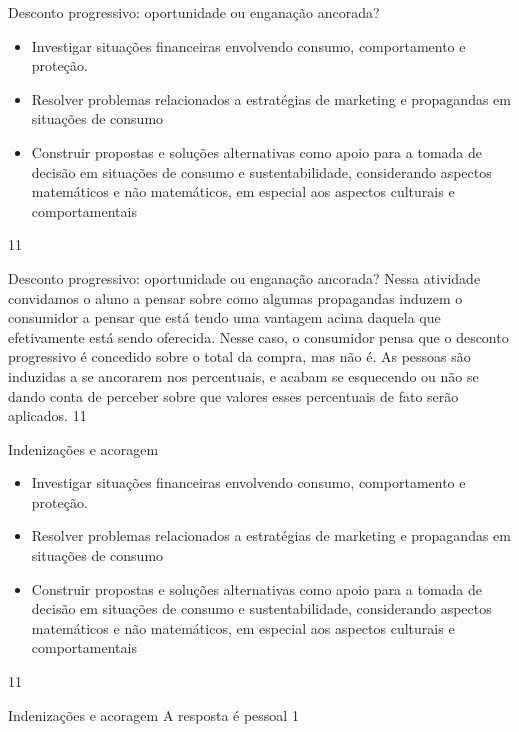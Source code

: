 \def\currentcolor{session2}
\begin{objectives}{Desconto progressivo: oportunidade ou enganação ancorada?}
{
\begin{itemize}
\item Investigar situações financeiras envolvendo consumo, comportamento e proteção.
\item Resolver problemas relacionados a estratégias de marketing e propagandas em situações de consumo
\item Construir propostas e soluções alternativas como apoio para a tomada de decisão em situações de consumo e sustentabilidade, considerando aspectos matemáticos e não matemáticos, em especial aos aspectos culturais e comportamentais
\end{itemize}
}{1}{1}
\end{objectives}
\marginpar{\vspace{-2.5em}}
\begin{sugestions}{Desconto progressivo: oportunidade ou enganação ancorada?}
{
Nessa atividade convidamos o aluno a pensar sobre como algumas propagandas induzem o consumidor a pensar que está tendo uma vantagem acima daquela que efetivamente está sendo oferecida. Nesse caso, o consumidor pensa que o desconto progressivo é concedido sobre o total da compra, mas não é. As pessoas são induzidas a se ancorarem nos percentuais, e acabam se esquecendo ou não se dando conta de perceber sobre que valores esses percentuais de fato serão aplicados.
}{1}{1}
\end{sugestions}
\marginpar{\vspace{-2.5em}}
\begin{objectives}{Indenizações e acoragem}
{
\begin{itemize}
\item Investigar situações financeiras envolvendo consumo, comportamento e proteção.
\item Resolver problemas relacionados a estratégias de marketing e propagandas em situações de consumo
\item Construir propostas e soluções alternativas como apoio para a tomada de decisão em situações de consumo e sustentabilidade, considerando aspectos matemáticos e não matemáticos, em especial aos aspectos culturais e comportamentais
\end{itemize}
}{1}{1}
\end{objectives}
\begin{answer}{Indenizações e acoragem}
{
  A resposta é pessoal
}{1}
\end{answer}
